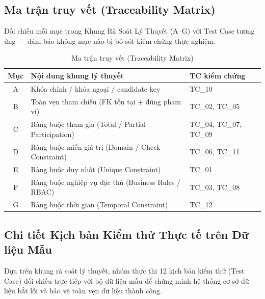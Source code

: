 \subsection{Ma trận truy vết (Traceability Matrix)}

Đối chiếu mỗi mục trong Khung Rà Soát Lý Thuyết (A–G) với Test Case tương ứng — đảm bảo không mục nào bị bỏ sót kiểm chứng thực nghiệm.

\begin{table}[h]
    \centering
    \caption{Ma trận truy vết (Traceability Matrix)}
    \label{tab:traceability_matrix}
    \renewcommand{\arraystretch}{1.3}
    \begin{tabular}{|c|p{8.5cm}|l|}
    \hline
    \textbf{Mục} & \textbf{Nội dung khung lý thuyết} & \textbf{TC kiểm chứng} \\ \hline
    A & Khóa chính / khóa ngoại / candidate key & TC\_10 \\ \hline
    B & Toàn vẹn tham chiếu (FK tồn tại + đúng phạm vi) & TC\_02, TC\_05 \\ \hline
    C & Ràng buộc tham gia (Total / Partial Participation) & TC\_04, TC\_07, TC\_09 \\ \hline
    D & Ràng buộc miền giá trị (Domain / Check Constraint) & TC\_06, TC\_11 \\ \hline
    E & Ràng buộc duy nhất (Unique Constraint) & TC\_01 \\ \hline
    F & Ràng buộc nghiệp vụ đặc thù (Business Rules / RBAC) & TC\_03, TC\_08 \\ \hline
    G & Ràng buộc thời gian (Temporal Constraint) & TC\_12 \\ \hline
    \end{tabular}
\end{table}


\subsection{Chi tiết Kịch bản Kiểm thử Thực tế trên Dữ liệu Mẫu}

Dựa trên khung rà soát lý thuyết, nhóm thực thi 12 kịch bản kiểm thử (Test Case) đối chiếu trực tiếp với bộ dữ liệu mẫu để chứng minh hệ thống cơ sở dữ liệu bắt lỗi và bảo vệ toàn vẹn dữ liệu thành công.

